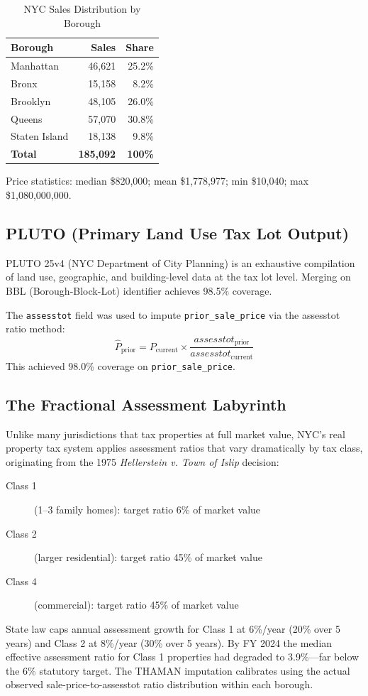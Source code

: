 \documentclass[11pt, a4paper, twoside]{article}
\begin{document}
\begin{table}[H]
  \centering
  \caption{NYC Sales Distribution by Borough}
  \label{tab:borough_dist}
  \begin{tabular}{lrr}
    \toprule
    Borough & Sales & Share \\
    \midrule
    Manhattan     & 46,621 & 25.2\% \\
    Bronx         & 15,158 &  8.2\% \\
    Brooklyn      & 48,105 & 26.0\% \\
    Queens        & 57,070 & 30.8\% \\
    Staten Island & 18,138 &  9.8\% \\
    \midrule
    \textbf{Total} & \textbf{185,092} & \textbf{100\%} \\
    \bottomrule
  \end{tabular}
\end{table}

Price statistics: median \$820,000; mean \$1,778,977; min \$10,040; max
\$1,080,000,000.

\subsection{PLUTO (Primary Land Use Tax Lot Output)}
PLUTO 25v4 (NYC Department of City Planning) is an exhaustive compilation of
land use, geographic, and building-level data at the tax lot level. Merging on
BBL (Borough-Block-Lot) identifier achieves 98.5\% coverage.

The \texttt{assesstot} field was used to impute \texttt{prior\_sale\_price} via
the assesstot ratio method:
\begin{equation}
  \hat{P}_{\text{prior}} = P_{\text{current}} \times
    \frac{\mathit{assesstot}_{\text{prior}}}{\mathit{assesstot}_{\text{current}}}
  \label{eq:assesstot}
\end{equation}
This achieved 98.0\% coverage on \texttt{prior\_sale\_price}.

\subsection{The Fractional Assessment Labyrinth}
Unlike many jurisdictions that tax properties at full market value, NYC's real
property tax system applies assessment ratios that vary dramatically by tax
class, originating from the 1975 \textit{Hellerstein v. Town of Islip} decision:
\begin{description}
  \item[Class 1] (1--3 family homes): target ratio 6\% of market value
  \item[Class 2] (larger residential): target ratio 45\% of market value
  \item[Class 4] (commercial): target ratio 45\% of market value
\end{description}
State law caps annual assessment growth for Class 1 at 6\%/year (20\% over 5
years) and Class 2 at 8\%/year (30\% over 5 years). By FY 2024 the median
effective assessment ratio for Class 1 properties had degraded to 3.9\%---far
below the 6\% statutory target. The THAMAN imputation calibrates using the
actual observed sale-price-to-assesstot ratio distribution within each borough.
\end{document}
